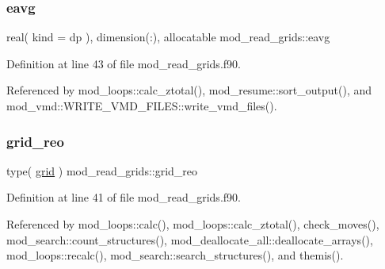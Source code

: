 \mbox{\label{namespacemod__read__grids_af9747d65a3c7dd6876ab803f0a06e8e9}} 
\subsubsection{\texorpdfstring{eavg}{eavg}}
{\footnotesize\ttfamily real( kind = dp ), dimension(\+:), allocatable mod\+\_\+read\+\_\+grids\+::eavg}



Definition at line 43 of file mod\+\_\+read\+\_\+grids.\+f90.



Referenced by mod\+\_\+loops\+::calc\+\_\+ztotal(), mod\+\_\+resume\+::sort\+\_\+output(), and mod\+\_\+vmd\+::\+W\+R\+I\+T\+E\+\_\+\+V\+M\+D\+\_\+\+F\+I\+L\+E\+S\+::write\+\_\+vmd\+\_\+files().

\mbox{\label{namespacemod__read__grids_add45049d527e2c5d636d8382bfe892e8}} 
\subsubsection{\texorpdfstring{grid\+\_\+reo}{grid\_reo}}
{\footnotesize\ttfamily type( \hyperlink{structmod__read__grids_1_1grid}{grid} ) mod\+\_\+read\+\_\+grids\+::grid\+\_\+reo}



Definition at line 41 of file mod\+\_\+read\+\_\+grids.\+f90.



Referenced by mod\+\_\+loops\+::calc(), mod\+\_\+loops\+::calc\+\_\+ztotal(), check\+\_\+moves(), mod\+\_\+search\+::count\+\_\+structures(), mod\+\_\+deallocate\+\_\+all\+::deallocate\+\_\+arrays(), mod\+\_\+loops\+::recalc(), mod\+\_\+search\+::search\+\_\+structures(), and themis().

\mbox{\label{namespacemod__read__grids_ab09110371e13fa11f9a839bde8da8fc7}} 
